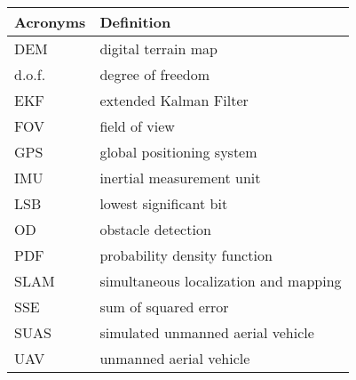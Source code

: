 \begin{center}
\begin{longtable}{ll}
  \hline
  \textbf{Acronyms} & \textbf{Definition} \\
  \hline\hline

DEM     &       digital terrain map\\
d.o.f.  &       degree of freedom \\
EKF     &       extended Kalman Filter \\
FOV	&	field of view	\\
GPS     &       global positioning system \\
IMU     &       inertial measurement unit \\
LSB     &       lowest significant bit  \\
OD      &       obstacle detection \\
PDF     &       probability density function \\
SLAM    &       simultaneous localization and mapping \\
SSE     &       sum of squared error\\
SUAS    &       simulated unmanned aerial vehicle \\
UAV     &       unmanned aerial vehicle\\
  \hline
\end{longtable}
\end{center}
